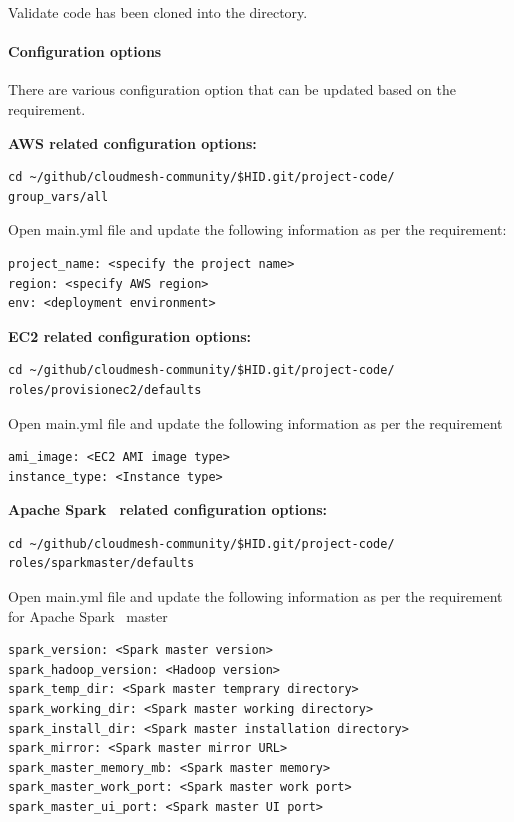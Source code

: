 Validate code has been cloned into the directory.

\paragraph{Configuration options}

There are various configuration option that can be updated based on
the requirement.

\textbf{AWS related configuration options:}

\begin{verbatim}
cd ~/github/cloudmesh-community/$HID.git/project-code/
group_vars/all
\end{verbatim}

Open main.yml file and update the following information as per the
requirement:

\begin{verbatim}
project_name: <specify the project name>
region: <specify AWS region>
env: <deployment environment>
\end{verbatim}

\textbf{EC2 related configuration options:}

\begin{verbatim}
cd ~/github/cloudmesh-community/$HID.git/project-code/
roles/provisionec2/defaults
\end{verbatim}

Open main.yml file and update the following information as per the
requirement

\begin{verbatim}
ami_image: <EC2 AMI image type>
instance_type: <Instance type>
\end{verbatim}

\textbf{Apache Spark~\cite{hid-sp18-511-www-spark} related configuration
options:}

\begin{verbatim}
cd ~/github/cloudmesh-community/$HID.git/project-code/
roles/sparkmaster/defaults
\end{verbatim}

Open main.yml file and update the following information as per the
requirement for Apache Spark~\cite{hid-sp18-511-www-spark} master

\begin{verbatim}
spark_version: <Spark master version>
spark_hadoop_version: <Hadoop version>
spark_temp_dir: <Spark master temprary directory>
spark_working_dir: <Spark master working directory>
spark_install_dir: <Spark master installation directory>
spark_mirror: <Spark master mirror URL>
spark_master_memory_mb: <Spark master memory>
spark_master_work_port: <Spark master work port>
spark_master_ui_port: <Spark master UI port>
\end{verbatim}

